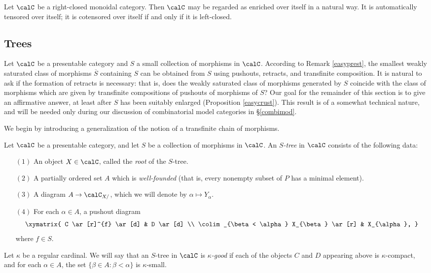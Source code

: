 \begin{example}
Let $\calC$ be a right-closed monoidal category. Then $\calC$ may be regarded as enriched over itself in a natural way. It is automatically tensored over itself; it is cotensored over itself if and only if it is left-closed.
\end{example}

\subsection{Trees}

Let $\calC$ be a presentable category and $S$ a small collection of morphisms in $\calC$.
According to Remark \ref{easyprest}, the smallest weakly saturated class of morphisms $\overline{S}$
containing $S$ can be obtained from $S$ using pushouts, retracts, and transfinite composition.
It is natural to ask if the formation of retracts is necessary: that is, does the weakly saturated class of morphisms generated by $S$ coincide with the class of morphisms which are given by transfinite compositions of pushouts of morphisms of $S$? Our goal for the remainder of this section is to give an affirmative answer, at least after $S$ has been suitably enlarged (Proposition \ref{easycrust}). This result is of a somewhat technical nature, and will be needed only during our discussion of combinatorial model categories in \S \ref{combimod}.

We begin by introducing a generalization of the notion of a transfinite chain of morphisms.

\begin{definition}
Let $\calC$ be a presentable category, and let $S$ be a collection of morphisms in $\calC$. 
An {\it $S$-tree} in $\calC$ consists of the following data:
\begin{itemize}
\item[$(1)$] An object $X \in \calC$, called the {\it root} of the $S$-tree.
\item[$(2)$] A partially ordered set $A$ which is {\it well-founded} (that is, every nonempty subset of $P$ has a minimal element).
\item[$(3)$] A diagram $A \rightarrow \calC_{X/}$, which we will denote by $\alpha \mapsto Y_{\alpha}$.
\item[$(4)$] For each $\alpha \in A$, a pushout diagram
$$ \xymatrix{ C \ar[r]^{f} \ar[d] & D \ar[d] \\
\colim_{\beta < \alpha} X_{\beta} \ar[r] & X_{\alpha}, }$$
where $f \in S$.
\end{itemize}
Let $\kappa$ be a regular cardinal. We will say that an $S$-tree in $\calC$ is {\it $\kappa$-good} if each of the objects $C$ and $D$ appearing above is $\kappa$-compact, and for each
$\alpha \in A$, the set $\{ \beta \in A: \beta < \alpha \}$ is $\kappa$-small.
\end{definition}

